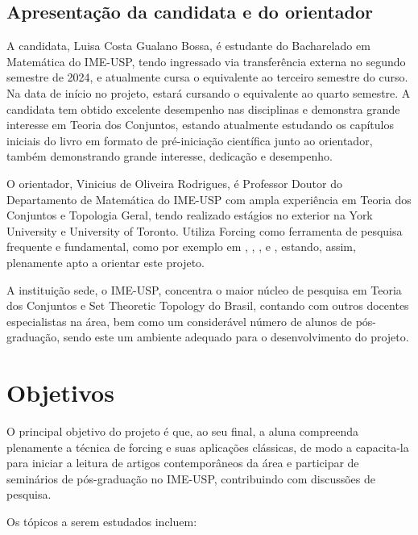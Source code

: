 \documentclass{article}
\begin{document}
    \subsection{Apresentação da candidata e do orientador}

    A candidata, Luisa Costa Gualano Bossa, é estudante do Bacharelado em Matemática do IME-USP, tendo ingressado via transferência externa no segundo semestre de 2024, e atualmente cursa o equivalente ao terceiro semestre do curso.
    Na data de início no projeto, estará cursando o equivalente ao quarto semestre.
    A candidata tem obtido excelente desempenho nas disciplinas e demonstra grande interesse em Teoria dos Conjuntos, estando atualmente estudando os capítulos iniciais do livro \cite{hrbacek2017introduction} em formato de pré-iniciação científica junto ao orientador, também demonstrando grande interesse, dedicação e desempenho.

    O orientador, Vinicius de Oliveira Rodrigues, é Professor Doutor do Departamento de Matemática do IME-USP com ampla experiência em Teoria dos Conjuntos e Topologia Geral, tendo realizado estágios no exterior na York University e University of Toronto.
    Utiliza Forcing como ferramenta de pesquisa frequente e fundamental, como por exemplo em \cite{bellini2021forcing}, \cite{carvalho2024products}, \cite{corral2022fin}, \cite{guzman2022maximal} e \cite{rodrigues2021almost}, estando, assim, plenamente apto a orientar este projeto.

    A instituição sede, o IME-USP, concentra o maior núcleo de pesquisa em Teoria dos Conjuntos e Set Theoretic Topology do Brasil, contando com outros docentes especialistas na área, bem como um considerável número de alunos de pós-graduação, sendo este um ambiente adequado para o desenvolvimento do projeto. 

    \section{Objetivos}
    O principal objetivo do projeto é que, ao seu final, a aluna compreenda plenamente a técnica de forcing e suas aplicações clássicas, de modo a capacita-la para iniciar a leitura de artigos contemporâneos da área e participar de seminários de pós-graduação no IME-USP, contribuindo com discussões de pesquisa.

    Os tópicos a serem estudados incluem:
\end{document}
